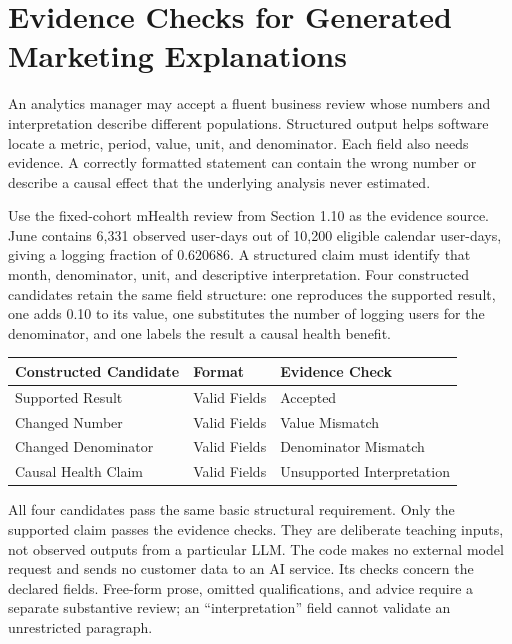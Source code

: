 \hypertarget{M08-evidence-checks-for-generated-marketing-explanations}{%
\section{Evidence Checks for Generated Marketing
Explanations}\label{M08-evidence-checks-for-generated-marketing-explanations}}

\noindent An analytics manager may accept a fluent business review whose numbers
and interpretation describe different populations. Structured output
helps software locate a metric, period, value, unit, and denominator.
Each field also needs evidence. A correctly formatted statement can
contain the wrong number or describe a causal effect that the underlying
analysis never estimated.

Use the fixed-cohort mHealth review from Section 1.10 as the evidence
source. June contains 6,331 observed user-days out of 10,200 eligible
calendar user-days, giving a logging fraction of 0.620686. A structured
claim must identify that month, denominator, unit, and descriptive
interpretation. Four constructed candidates retain the same field
structure: one reproduces the supported result, one adds 0.10 to its
value, one substitutes the number of logging users for the denominator,
and one labels the result a causal health benefit.

\begin{table}[H]
\centering\small
\begin{tabular}{@{}lll@{}}
\toprule
Constructed Candidate & Format & Evidence Check \\
\midrule

Supported Result & Valid Fields & Accepted \\
Changed Number & Valid Fields & Value Mismatch \\
Changed Denominator & Valid Fields & Denominator Mismatch \\
Causal Health Claim & Valid Fields & Unsupported Interpretation \\
\bottomrule
\end{tabular}
\end{table}

All four candidates pass the same basic structural requirement. Only the
supported claim passes the evidence checks. They are deliberate teaching
inputs, not observed outputs from a particular LLM. The code makes no
external model request and sends no customer data to an AI service. Its
checks concern the declared fields. Free-form prose, omitted
qualifications, and advice require a separate substantive review; an
``interpretation'' field cannot validate an unrestricted paragraph.

